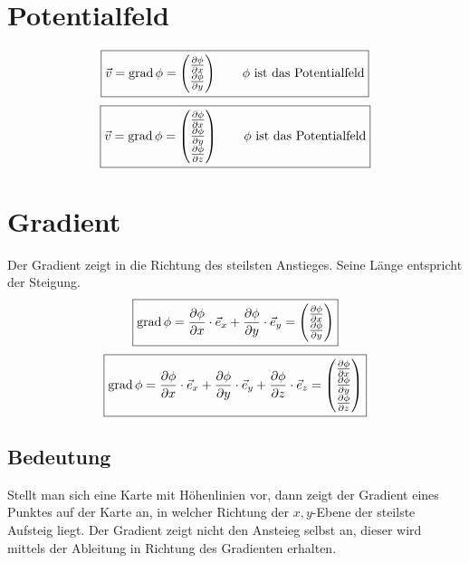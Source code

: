 \section{Potentialfeld}
\[ \boxed{\vec{v} = \grad \phi =
\left(\begin{array}{@{}l@{}} 
\frac{\partial \phi}{\partial x} \\
\frac{\partial \phi}{\partial y} \\
\end{array}\right) \qquad \text{$\phi$ ist das Potentialfeld}} \]
\[ \boxed{\vec{v} = \grad \phi =
\left(\begin{array}{@{}l@{}} 
\frac{\partial \phi}{\partial x} \\
\frac{\partial \phi}{\partial y} \\
\frac{\partial \phi}{\partial z} \\
\end{array}\right) \qquad \text{$\phi$ ist das Potentialfeld}} \]

\section{Gradient}\label{sec:gradient}
Der Gradient zeigt in die Richtung des steilsten Anstieges. Seine Länge 
entspricht der Steigung. 
\[ \boxed{\grad \phi = \frac{\partial \phi}{\partial x} \cdot \vec{e}_x 
+ \frac{\partial \phi}{\partial y} \cdot \vec{e}_y 
= \left(\begin{array}{@{}l@{}} 
\frac{\partial \phi}{\partial x} \\
\frac{\partial \phi}{\partial y} \\
\end{array}\right)} \]
\[ \boxed{\grad \phi = \frac{\partial \phi}{\partial x} \cdot \vec{e}_x 
+ \frac{\partial \phi}{\partial y} \cdot \vec{e}_y 
+ \frac{\partial \phi}{\partial z} \cdot \vec{e}_z 
= \left(\begin{array}{@{}l@{}} 
\frac{\partial \phi}{\partial x} \\
\frac{\partial \phi}{\partial y} \\
\frac{\partial \phi}{\partial z} \\
\end{array}\right)} \]

\subsection{Bedeutung} Stellt man sich eine Karte mit Höhenlinien vor, 
dann zeigt der Gradient eines Punktes auf der Karte an, in welcher Richtung 
der $x,y$-Ebene der steilste Aufsteig liegt. Der Gradient zeigt nicht den 
Ansteieg selbst an, dieser wird mittels der Ableitung in Richtung des 
Gradienten erhalten.

